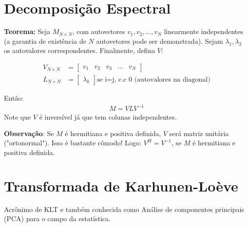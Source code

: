 \documentclass{article}
\begin{document}
\section{Decomposição Espectral}
\textbf{Teorema:} Seja $M_{N \times N}$, com autovetores $v_1, v_2, \ldots, v_N$ linearmente
independentes (a garantia de existência de $N$ autovetores pode ser demonstrada). Sejam
$\lambda_1,\lambda_2$ os autovalores correspondentes. Finalmente, defina $V$:

\begin{align*}
    V_{N \times N} &=
    \begin{bmatrix}
        v_1 & v_2 & v_3 & \ldots & v_N
    \end{bmatrix} \\
    L_{N \times N} &=
    \begin{bmatrix}
        \lambda_k
    \end{bmatrix} \text{se i=j, c.c 0 (autovalores na diagonal)}
\end{align*}

Então:
\begin{align*}
    M = V L V^{-1}
\end{align*}
Note que $V$ é inversível já que tem colunas independentes.

\textbf{Observação}: Se $M$ é hermitiana e positiva definida, $V$ será matriz unitária
("ortonormal"). Isso é bastante cômodo! Logo: $V^H = V^{-1}$, se $M$ é hermitiana e positiva
definida.

\section{Transformada de Karhunen-Loève}
Acrônimo de KLT e também conhecida como Análise de componentes principais (PCA) para o campo da
estatística.
\end{document}
